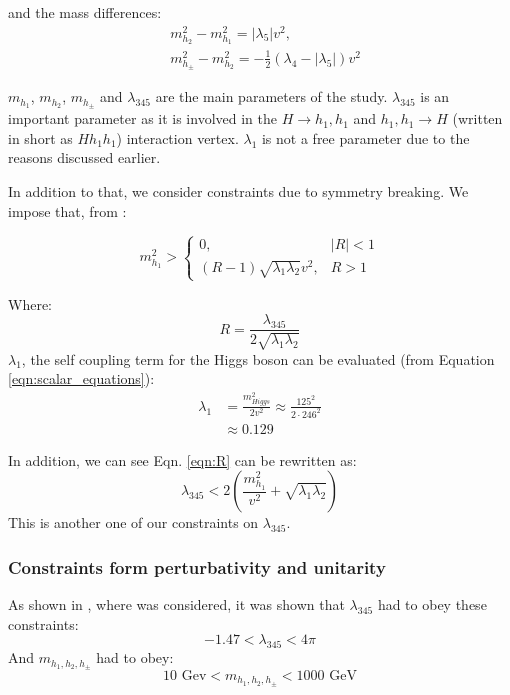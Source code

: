 \documentclass[12pt]{article}
\begin{document}
and the mass differences: 
\begin{align}
    &m_{h_2}^2 - m_{h_1}^2 =  |\lambda_5|v^2, \\
    &m_{h_\pm}^2 - m_{h_2}^2 = -\frac{1}{2}(\lambda_4 - |\lambda_5|)v^2
\end{align}

$m_{h_1}$, $m_{h_2}$, $m_{h_\pm}$ and $\lambda_{345}$ are the main parameters of the study. $\lambda_{345}$ is an important parameter as it is involved in the $H\rightarrow h_1,h_1$ and $h_1,h_1 \rightarrow H$ (written in short as $Hh_1h_1$) interaction vertex. $\lambda_1$ is not a free parameter due to the reasons discussed earlier.

In addition to that, we consider constraints due to symmetry breaking. We impose that, from \cite{Belyaev:2016lok, Ginzburg2010}:

\begin{equation}
    m_{h_1}^2 >
        \begin{cases}
         0, & |R| < 1\\
         (R-1) \sqrt{\lambda_1\lambda_2} v^2, & R>1
        \end{cases}
        \label{eqn:R}
\end{equation}

Where:
\begin{equation}
    R = \frac{\lambda_{345}}{2\sqrt{\lambda_1\lambda_2}}
\end{equation}
$\lambda_1$, the self coupling term for the Higgs boson can be evaluated (from Equation \ref{eqn:scalar_equations}):
\begin{equation}
    \begin{split}
        \lambda_1 &= \frac{m^2_{Higgs}}{2 v^2}
                \approx\frac{125^2}{2\cdot 246 ^ 2} \\
                &\approx0.129
    \end{split}
\end{equation}

In addition, we can see Eqn. \ref{eqn:R} can be rewritten as:
\begin{equation}
    \lambda_{345} < 2\left( \frac{m_{h_1}^2}{v^2} + \sqrt{\lambda_1\lambda_2}\right)
\end{equation}
This is another one of our constraints on $\lambda_{345}$.

\subsubsection{Constraints form perturbativity and unitarity}
As shown in \cite{Belyaev:2016lok}, where \cite{Aruhrib2012Inert} was considered, it was shown that $\lambda_{345}$ had to obey these constraints:
\begin{equation}
    -1.47 < \lambda_{345} < 4\pi
    \label{eqn:l345_pert}
\end{equation}
And $m_{h_1, h_2, h_\pm}$ had to obey:
\begin{equation}
    10\text{ Gev} < m_{h_1, h_2, h_\pm} < 1000\text{ GeV}
    \label{eqn:masses_pert}
\end{equation}
\end{document}
